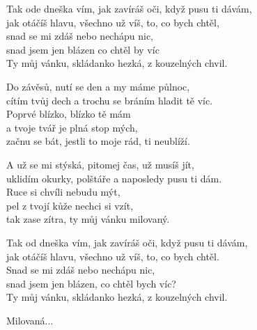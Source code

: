 
\ve{}
Tak ode dneška vím, jak zavíráš oči, když pusu ti dávám,\\
jak otáčíš hlavu, všechno už víš, to, co bych chtěl,\\
snad se mi zdáš nebo nechápu nic,\\
snad jsem jen blázen co chtěl by víc\\
Ty můj vánku, skládanko hezká, z kouzelných chvil.

\ve{}
Do závěsů, nutí se den a my máme půlnoc,\\
cítím tvůj dech a trochu se bráním hladit tě víc.\\
Poprvé blízko, blízko tě mám\\
a tvoje tvář je plná stop mých,\\ 
začnu se bát, jestli to moje rád, ti neublíží. 

\ve{}
A už se mi stýská, pitomej čas, už musíš jít,\\
uklidím okurky, polštáře a naposledy pusu ti dám.\\ 
Ruce si chvíli nebudu mýt,\\
pel z tvojí kůže nechci si vzít,\\ 
tak zase zítra, ty můj vánku milovaný. 

\ve{}
Tak od dneška vím, jak zavíráš oči, když pusu ti dávám,\\
jak otáčíš hlavu, všechno už víš, to, co bych chtěl.\\
Snad se mi zdáš nebo nechápu nic,\\
snad jsem jen blázen, co chtěl bych víc?\\
Ty můj vánku, skládanko hezká, z kouzelných chvil.

Milovaná...

\esong